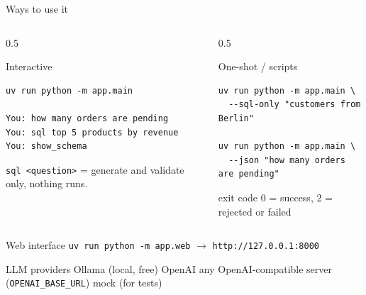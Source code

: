 \documentclass[aspectratio=169,10pt]{beamer}
\begin{document}
\begin{frame}[fragile]{Ways to use it}
  \begin{columns}[T]
    \begin{column}{0.5\textwidth}
      \begin{block}{Interactive}
\begin{lstlisting}
uv run python -m app.main

You: how many orders are pending
You: sql top 5 products by revenue
You: show_schema
\end{lstlisting}
        \footnotesize \texttt{sql <question>} = generate and validate only,
        nothing runs.
      \end{block}
    \end{column}
    \begin{column}{0.5\textwidth}
      \begin{block}{One-shot / scripts}
\begin{lstlisting}
uv run python -m app.main \
  --sql-only "customers from Berlin"

uv run python -m app.main \
  --json "how many orders are pending"
\end{lstlisting}
        \footnotesize exit code 0 = success, 2 = rejected or failed
      \end{block}
    \end{column}
  \end{columns}

  \vspace{6pt}
  \begin{block}{Web interface}
    \footnotesize \texttt{uv run python -m app.web} $\rightarrow$ \texttt{http://127.0.0.1:8000}
  \end{block}
  \begin{block}{LLM providers}
    \footnotesize Ollama (local, free) \textperiodcentered{} OpenAI \textperiodcentered{}
    any OpenAI-compatible server (\texttt{OPENAI\_BASE\_URL}) \textperiodcentered{}
    mock (for tests)
  \end{block}
\end{frame}
\end{document}
